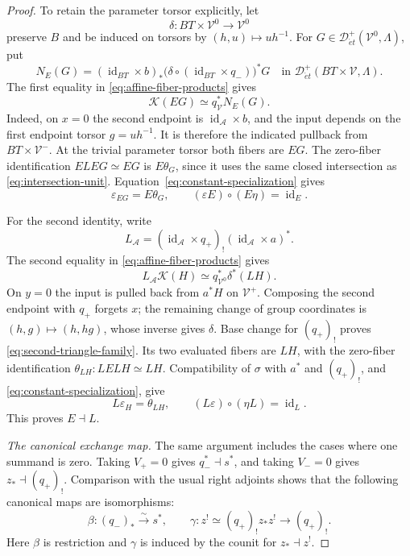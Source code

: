 \documentclass[11pt,a4paper]{article}
\newcommand{\Det}{\mathcal D_{\acute et}}
\newcommand{\cA}{\mathscr A}
\theoremstyle{notes}
\begin{document}
\begin{proof}
To retain the parameter torsor explicitly, let
\[
\delta:BT\times\mathscr V^0\longrightarrow\mathscr V^0
\]
preserve $B$ and be induced on torsors by $(h,u)\mapsto uh^{-1}$. For $G\in\Det^+(\mathscr V^0,\Lambda)$, put
\[
N_E(G)=(\operatorname{id}_{BT}\times b)_*
\bigl(\delta\circ(\operatorname{id}_{BT}\times q_-)\bigr)^*G
\quad\text{in }\Det^+(BT\times\mathscr V,\Lambda).
\]
The first equality in \eqref{eq:affine-fiber-products} gives
\begin{equation}\label{eq:first-triangle-family}
\mathcal K(EG)\simeq q_{\mathscr V}^*N_E(G).
\end{equation}
Indeed, on $x=0$ the second endpoint is $\operatorname{id}_{\cA}\times b$, and the input depends on the first endpoint torsor $g=u h^{-1}$. It is therefore the indicated pullback from $BT\times\mathscr V^-$. At the trivial parameter torsor both fibers are $EG$. The zero-fiber identification $ELEG\simeq EG$ is $E\theta_G$, since it uses the same closed intersection as \eqref{eq:intersection-unit}. Equation~\eqref{eq:constant-specialization} gives
\[
\varepsilon_{EG}=E\theta_G,\qquad
(\varepsilon E)\circ(E\eta)=\operatorname{id}_E.
\]

For the second identity, write
\[
L_{\cA}=(\operatorname{id}_{\cA}\times q_+)_!
(\operatorname{id}_{\cA}\times a)^*.
\]
The second equality in \eqref{eq:affine-fiber-products} gives
\begin{equation}\label{eq:second-triangle-family}
L_{\cA}\mathcal K(H)\simeq q_{\mathscr V^0}^*\delta^*(LH).
\end{equation}
On $y=0$ the input is pulled back from $a^*H$ on $\mathscr V^+$. Composing the second endpoint with $q_+$ forgets $x$; the remaining change of group coordinates is $(h,g)\mapsto(h,hg)$, whose inverse gives $\delta$. Base change for $(q_+)_!$ proves \eqref{eq:second-triangle-family}. Its two evaluated fibers are $LH$, with the zero-fiber identification $\theta_{LH}:LELH\simeq LH$. Compatibility of $\sigma$ with $a^*$ and $(q_+)_!$, and \eqref{eq:constant-specialization}, give
\[
L\varepsilon_H=\theta_{LH},\qquad
(L\varepsilon)\circ(\eta L)=\operatorname{id}_L.
\]
This proves $E\dashv L$.

\emph{The canonical exchange map.}
The same argument includes the cases where one summand is zero. Taking $V_+=0$ gives $q_-^*\dashv s^*$, and taking $V_-=0$ gives $z_*\dashv(q_+)_!$. Comparison with the usual right adjoints shows that the following canonical maps are isomorphisms:
\begin{equation}\label{eq:linear-contractions}
\beta:(q_-)_*\xrightarrow{\sim}s^*,\qquad
\gamma:z^!\simeq(q_+)_!z_*z^!\longrightarrow(q_+)_!.
\end{equation}
Here $\beta$ is restriction and $\gamma$ is induced by the counit for $z_*\dashv z^!$.


\end{proof}
\end{document}

